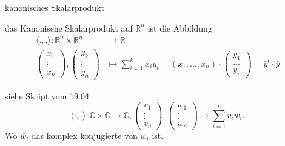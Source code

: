 \documentclass[class=article, crop=false]{standalone}
\begin{document}
\begin{zettel}{kanonisches Skalarprodukt}
\begin{flashcard}[]{}
	\begin{definition}
		das Kanonische Skalarprodukt auf $\mathbb{R}^n $  ist die Abbildung
		\begin{align*}
			\langle .,.\rangle : \mathbb{R}^n \times \mathbb{R}^n                                                                  & \longrightarrow \mathbb{R}                                                                                                                           \\
			\begin{pmatrix}x_1\\ \vdots\\ x_n\end{pmatrix}, \begin{pmatrix}y_2\\ \vdots\\ y_n\end{pmatrix} & \mapsto \sum_{i = 1}^{k} x_i  y_i  = (x_1 , \dots , x_n ) \cdot \begin{pmatrix}y_1\\ \dots\\ y_n\end{pmatrix}  = \bar{y}^t \cdot \bar{y}
		\end{align*}
	\end{definition}
\end{flashcard}


\begin{flashcard}[40po2j06]{}
	\begin{definition}
		siehe Skript vom 19.04
		\[
			\langle \cdot,\cdot\rangle : \mathbb{C} \times \mathbb{C} \longrightarrow  \mathbb{C}, \begin{pmatrix}v_1 \\ \vdots \\ v_n\end{pmatrix}, \begin{pmatrix}w_1 \\ \vdots \\ w_n\end{pmatrix} \mapsto \sum_{i = 1}^{n} v_i \bar{w_i}
		.\]
		Wo $ \bar{w_i} $ das komplex konjugierte von $w_i $ ist.
	\end{definition}
\end{flashcard}
\end{zettel}
\end{document}
